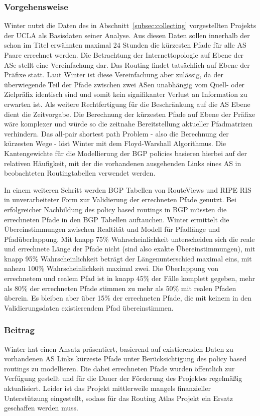 \subsubsection{Vorgehensweise}
Winter nutzt die Daten des in Abschnitt~\ref{subsec:collecting} vorgestellten Projekts der UCLA als Basisdaten seiner Analyse.
Aus diesen Daten sollen innerhalb der schon im Titel erwähnten maximal 24 Stunden die kürzesten Pfade für alle AS Paare errechnet werden.
Die Betrachtung der Internettopologie auf Ebene der ASe stellt eine Vereinfachung dar.
Das Routing findet tatsächlich auf Ebene der Präfixe statt.
Laut Winter ist diese Vereinfachung aber zulässig, da der überwiegende Teil der Pfade zwischen zwei ASen unabhängig vom Quell- oder Zielpräfix identisch sind und somit kein signifikanter Verlust an Information zu erwarten ist.
Als weitere Rechtfertigung für die Beschränkung auf die AS Ebene dient die Zeitvorgabe.
Die Berechnung der kürzesten Pfade auf Ebene der Präfixe wäre komplexer und würde so die zeitnahe Bereitstellung aktueller Pfadmatrizen verhindern.
Das all-pair shortest path Problem - also die Berechnung der kürzesten Wege - löst Winter mit dem Floyd-Warshall Algorithmus.
Die Kantengewichte für die Modellierung der BGP policies basieren hierbei auf der relativen Häufigkeit, mit der die vorhandenen ausgehenden Links eines AS in beobachteten Routingtabellen verwendet werden.

In einem weiteren Schritt werden BGP Tabellen von RouteViews und RIPE RIS in unverarbeiteter Form zur Validierung der errechneten Pfade genutzt.
Bei erfolgreicher Nachbildung des policy based routings in BGP müssten die errechneten Pfade in den BGP Tabellen auftauchen.
Winter ermittelt die Übereinstimmungen zwischen Realtität und Modell für Pfadlänge und Pfadüberlappung.
Mit knapp 75\% Wahrscheinlichkeit unterscheiden sich die reale und errechnete Länge der Pfade nicht (sind also exakte Übereinstimmungen), mit knapp 95\% Wahrscheinlichkeit beträgt der Längenunterschied maximal eins, mit nahezu 100\% Wahrscheinlichkeit maximal zwei.
Die Überlappung von errechnetem und realem Pfad ist in knapp 45\% der Fälle komplett gegeben, mehr als 80\% der errechneten Pfade stimmen zu mehr als 50\% mit realen Pfaden überein.
Es bleiben aber über 15\% der errechneten Pfade, die mit keinem in den Validierungsdaten existierendem Pfad übereinstimmen.

\subsubsection{Beitrag}
Winter hat einen Ansatz präsentiert, basierend auf existierenden Daten zu vorhandenen AS Links kürzeste Pfade unter Berücksichtigung des policy based routings zu modellieren.
Die dabei errechneten Pfade wurden öffentlich zur Verfügung gestellt und für die Dauer der Förderung des Projektes regelmäßig aktualisiert.
Leider ist das Projekt mittlerweile mangels finanzieller Unterstützung eingestellt, sodass für das Routing Atlas Projekt ein Ersatz geschaffen werden muss.
